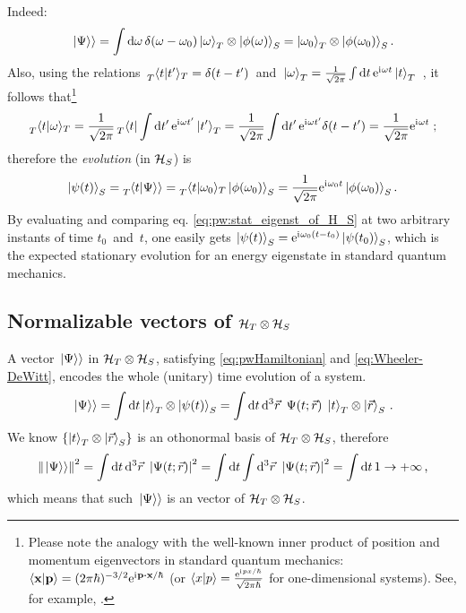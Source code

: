 Indeed:
\[
  \left.\left| \Psi \right\rangle\right\rangle = \int \dd{\omega} \delta(\omega-\omega_0)\ket{\omega}_T \otimes \ket{\phi(\omega)}_S =
    \ket{\omega_0}_T \otimes \ket{\phi(\omega_0)}_S \text{.}
\]
Also, using the relations
$
\, \prescript{}{T}{\braket{t}{t'}}_T = \delta(t-t') \,
$
and
$
  \,
  \ket{\omega}_T =
  \frac{1}{\sqrt{2\pi}} \int\dd{t}\mathrm{e}^{\mathrm{i}\mkern1mu\omega t}\ket{t}_T
  \,
$
\parencite{Lloyd:Time},
it follows that\footnote{%
  Please note the analogy with the well-known
  inner product of position and momentum eigenvectors in standard quantum mechanics:
  $\braket{\vb{x}}{\vb{p}} = (2\pi\hbar)^{-3/2}\E^{\iu \vb{p} \vdot \vb{x}  / \hbar}$
  (or $\braket{x}{p} = \frac{\mathrm{e}^{\mathrm{i}\mkern1mu p x / \hbar}}{\sqrt{2\pi\hbar}}$ for one-dimensional systems).
  See, for example, \cite[126--127]{Ballentine}.
}
\[
  \prescript{}{T}{\braket{t}{\omega}}_T =
  \frac{1}{\sqrt{2\pi}}\prescript{}{T}{\bra{t}} \int\dd{t'}\mathrm{e}^{\mathrm{i}\mkern1mu\omega t'}\ket{t'}_T  =
  \frac{1}{\sqrt{2\pi}}\int\dd{t'}\mathrm{e}^{\mathrm{i}\mkern1mu\omega t'}\delta(t-t') =
  \frac{1}{\sqrt{2\pi}} \mathrm{e}^{\mathrm{i}\mkern1mu\omega t} \; \text{;}
\]
therefore the \emph{evolution} (in $\mathcal{H}_S$) is
\begin{equation}
  \ket{\psi(t)}_S = \prescript{}{T}{\!\left.\left\langle t \middle| \Psi \right\rangle\right\rangle} = \prescript{}{T}{\braket{t}{\omega_0}}_{T} \ket{\phi(\omega_0)}_S =
    \frac{1}{\sqrt{2\pi}} \mathrm{e}^{\mathrm{i}\mkern1mu\omega_0 t} \ket{\phi(\omega_0)}_S \text{.}
\label{eq:pw:stat_eigenst_of_H_S}
\end{equation}
By evaluating and comparing eq. \eqref{eq:pw:stat_eigenst_of_H_S} at two arbitrary instants of time
$t_0$~and~$t$,
one easily gets
$\ket{\psi(t)}_{S} = \mathrm{e}^{\mathrm{i}\mkern1mu\omega_{0}(t-t_{0})} \ket{\psi(t_0)}_{S}$,
which is the expected stationary evolution for an energy eigenstate in standard quantum mechanics. 






\subsection{Normalizable vectors of $\mathcal{H}_T \otimes \mathcal{H}_S$}
\label{sec:properpw}

A vector $\left.\left| \Psi \right\rangle\right\rangle$ in $\mathcal{H}_T \otimes \mathcal{H}_S$,
satisfying \eqref{eq:pwHamiltonian} and \eqref{eq:Wheeler-DeWitt},
encodes the whole (unitary) time evolution of a system.
\begin{equation}\label{eq:pwexpansion}
  \left.\left| \Psi \right\rangle\right\rangle =
    \int \dd{t} \ket{t}_T \otimes \ket{\psi(t)}_S =
    \int \dd{t}\dd[3]{\vec{r}} \ \Psi(t; \vec{r}) \; \ket{t}_T \otimes \ket{\vec{r}}_S
    \,  \text{.}
\end{equation}
We know $\left\{\ket{t}_T \otimes \ket{\vec{r}}_S\right\}$ is an othonormal basis of $\mathcal{H}_T \otimes \mathcal{H}_S$, therefore
\begin{equation}
  \norm{\left.\left| \Psi \right\rangle\right\rangle}^2 =
    \int \dd{t}\dd[3]{\vec{r}} \ \abs{\Psi(t; \vec{r})}^2 =
    \int \dd{t} \int \dd[3]{\vec{r}} \ \abs{\Psi(t; \vec{r})}^2 =
    \int \dd{t} 1 \rightarrow +\infty
    \,  \text{,}
\end{equation}
which means that such $\left.\left| \Psi \right\rangle\right\rangle$ is an  vector of $\mathcal{H}_T \otimes \mathcal{H}_S$.

